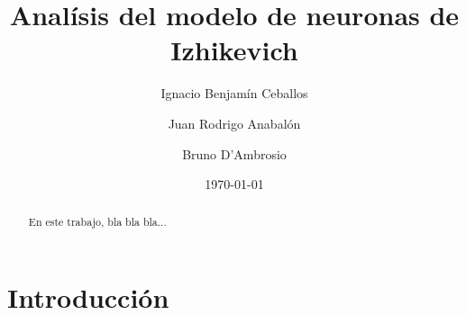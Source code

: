 \documentclass[aps,prl,preprint,groupedaddress]{revtex4-2}
\begin{document}

\title{
Analísis del modelo de neuronas de Izhikevich
}


\author{Ignacio Benjamín Ceballos}
\email[]{-}

\author{Juan Rodrigo Anabalón}
\email[]{-}

\author{Bruno D'Ambrosio}



\date{\today}

\begin{abstract}
En este trabajo, bla bla bla...
\end{abstract}


\maketitle

\section{Introducción}
\end{document}
